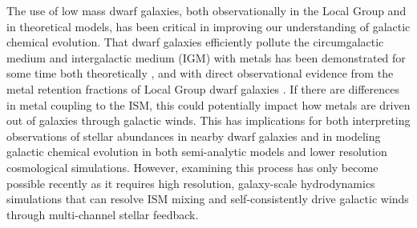 \documentclass[twocolumn]{aastex61}
\begin{document}
The use of low mass dwarf galaxies, both observationally in the Local Group and in theoretical models, has been critical in improving our understanding of galactic chemical evolution. That dwarf galaxies efficiently pollute the circumgalactic medium and intergalactic medium (IGM) with metals has been demonstrated for some time both theoretically \citep[e.g.][]{DekelSilk1986,MacLowFerrara1999,Fragile2004,Muratov2017,Corlies2018}, and with direct observational evidence from the metal retention fractions of Local Group dwarf galaxies \citep[e.g.][]{Kirby2011-metals,McQuinn2015}. If there are differences in metal coupling to the ISM, this could potentially impact how metals are driven out of galaxies through galactic winds. This has implications for both interpreting observations of stellar abundances in nearby dwarf galaxies and in modeling galactic chemical evolution in both semi-analytic models and lower resolution cosmological simulations. However, examining this process has only become possible recently as it requires high resolution, galaxy-scale hydrodynamics simulations that can resolve ISM mixing and self-consistently drive galactic winds through multi-channel stellar feedback.
\end{document}
